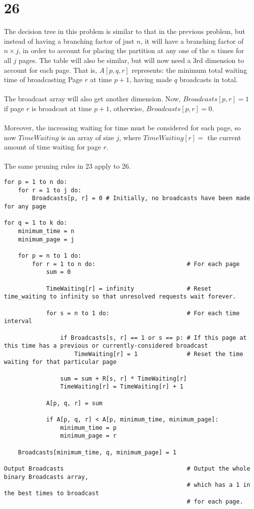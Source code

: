 \documentclass[letterpaper,notitlepage,twoside]{article}
\begin{document}
\section*{26}

The decision tree in this problem is similar to that in the previous problem, but instead of having a branching factor of just $n$, it will have a branching factor of $n\times j$, in order to account for placing the partition at any one of the $n$ times for all $j$ pages. The table will also be similar, but will now need a 3rd dimension to account for each page. That is, $A[p, q, r]$ represents: the minimum total waiting time of broadcasting Page $r$ at time $p + 1$, having made $q$ broadcasts in total. \\\\
The broadcast array will also get another dimension. Now, $Broadcasts[p, r] = 1$ if page $r$ is broadcast at time $p + 1$, otherwise, $Broadcasts[p, r] = 0$.
\\\\
Moreover, the increasing waiting for time must be considered for each page, so now $TimeWaiting$ is an array of size $j$, where $TimeWaiting[r] =$ the current amount of time waiting for page $r$.
\\\\
The same pruning rules in 23 apply to 26. 

\begin{verbatim}
for p = 1 to n do:
    for r = 1 to j do:
        Broadcasts[p, r] = 0 # Initially, no broadcasts have been made for any page

for q = 1 to k do:
    minimum_time = n
    minimum_page = j
    
    for p = n to 1 do:
        for r = 1 to n do:                          # For each page
            sum = 0
        
            TimeWaiting[r] = infinity               # Reset time_waiting to infinity so that unresolved requests wait forever.
        
            for s = n to 1 do:                      # For each time interval
            
                if Broadcasts[s, r] == 1 or s == p: # If this page at this time has a previous or currently-considered broadcast
                    TimeWaiting[r] = 1              # Reset the time waiting for that particular page

                sum = sum + R[s, r] * TimeWaiting[r]
                TimeWaiting[r] = TimeWaiting[r] + 1
                
            A[p, q, r] = sum
        
            if A[p, q, r] < A[p, minimum_time, minimum_page]:
                minimum_time = p
                minimum_page = r
        
    Broadcasts[minimum_time, q, minimum_page] = 1

Output Broadcasts                                   # Output the whole binary Broadcasts array,
                                                    # which has a 1 in the best times to broadcast
                                                    # for each page.
\end{verbatim}
\end{document}
